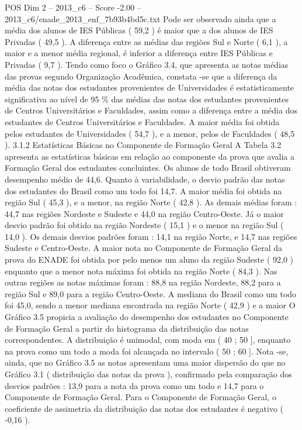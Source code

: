 \begin{textsample}{POS Dim 2 – 2013\_c6 – Score -2.00 – 2013\_c6/enade\_2013\_enf\_7b93b4bd5c.txt}
Pode ser observado ainda que a média dos alunos de IES Públicas ( 59,2 ) é maior que a dos alunos de IES Privadas ( 49,5 ).
A diferença entre as médias das regiões Sul e Norte ( 6,1 ), a maior e a menor média regional, é inferior a diferença entre IES Públicas e Privadas ( 9,7 ).
Tendo como foco o Gráfico 3.4, que apresenta as notas médias das provas segundo Organização Acadêmica, constata -se que a diferença da média das notas dos estudantes provenientes de Universidades é estatisticamente significativa ao nível de 95 \% das médias das notas dos estudantes provenientes de Centros Universitários e Faculdades, assim como a diferença entre a média dos estudantes de Centros Universitários e Faculdades.
A maior média foi obtida pelos estudantes de Universidades ( 54,7 ), e a menor, pelos de Faculdades ( 48,5 ). 3.1.2 Estatísticas Básicas no Componente de Formação Geral A Tabela 3.2 apresenta as estatísticas básicas em relação ao componente da prova que avalia a Formação Geral dos estudantes concluintes.
Os alunos de todo Brasil obtiveram desempenho médio de 44,6.
Quanto à variabilidade, o desvio padrão das notas dos estudantes do Brasil como um todo foi 14,7.
A maior média foi obtida na região Sul ( 45,3 ), e a menor, na região Norte ( 42,8 ).
As demais médias foram : 44,7 nas regiões Nordeste e Sudeste e 44,0 na região Centro-Oeste.
Já o maior desvio padrão foi obtido na região Nordeste ( 15,1 ) e o menor na região Sul ( 14,0 ).
Os demais desvios padrões foram : 14,1 na região Norte, e 14,7 nas regiões Sudeste e Centro-Oeste.
A maior nota no Componente de Formação Geral da prova do ENADE foi obtida por pelo menos um aluno da região Sudeste ( 92,0 ) enquanto que a menor nota máxima foi obtida na região Norte ( 84,3 ).
Nas outras regiões as notas máximas foram : 88,8 na região Nordeste, 88,2 para a região Sul e 89,0 para a região Centro-Oeste.
A mediana do Brasil como um todo foi 45,0, sendo a menor mediana encontrada na região Norte ( 42,9 ) e a maior O Gráfico 3.5 propicia a avaliação do desempenho dos estudantes no Componente de Formação Geral a partir do histograma da distribuição das notas correspondentes.
A distribuição é unimodal, com moda em ( 40 ; 50 ], enquanto na prova como um todo a moda foi alcançada no intervalo ( 50 ; 60 ].
Nota -se, ainda, que no Gráfico 3.5 as notas apresentam uma maior dispersão do que no Gráfico 3.1 ( distribuição das notas da prova ), confirmado pela comparação dos desvios padrões : 13,9 para a nota da prova como um todo e 14,7 para o Componente de Formação Geral.
Para o Componente de Formação Geral, o coeficiente de assimetria da distribuição das notas dos estudantes é negativo ( -0,16 ).

\end{textsample}
